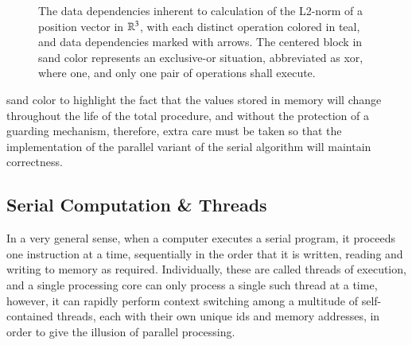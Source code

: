 {{\begin{figure}[ht]
{}
	{\caption[Data Dependencies in the L2-norm Calculation]{The data dependencies inherent to calculation of the L2-norm of a position vector in $\mathbb{R}^{3}$, with each distinct operation colored in teal, and data dependencies marked with arrows. The centered block in sand color represents an exclusive-or situation, abbreviated as xor, where one, and only one pair of operations shall execute.}\label{fig:dataDependencyOfL2Norm}}
\end{figure}


sand color to highlight the fact that the values stored in memory will change throughout the life of the total procedure, and without the protection of a guarding mechanism, therefore, extra care must be taken so that the implementation of the parallel variant of the serial algorithm will maintain correctness.



%

%
%

%
\subsection{Serial Computation \& Threads}
In a very general sense, when a computer executes a serial program, it proceeds one instruction at a time, sequentially in the order that it is written, reading and writing to memory as required. Individually, these are called threads of execution, and a single processing core can only process a single such thread at a time, however, it can rapidly perform context switching among a multitude of self-contained threads, each with their own unique ids and memory addresses, in order to give the illusion of parallel processing.

}}
